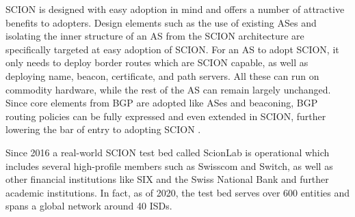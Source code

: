 \documentclass[../eva1_scion.tex]{subfiles}
\begin{document}
    SCION is designed with easy adoption in mind and offers a number of attractive benefits to adopters. Design elements such as the use of existing ASes and isolating the inner structure of an AS from the SCION architecture are specifically targeted at easy adoption of SCION. For an AS to adopt SCION, it only needs to deploy border routes which are SCION capable, as well as deploying name, beacon, certificate, and path servers. All these can run on commodity hardware, while the rest of the AS can remain largely unchanged. Since core elements from BGP are adopted like ASes and beaconing, BGP routing policies can be fully expressed and even extended in SCION, further lowering the bar of entry to adopting SCION \cite{scion_2017}.

    Since 2016 a real-world SCION test bed called ScionLab is operational \cite{testbed_2020} which includes several high-profile members such as Swisscom and Switch, as well as other financial institutions like SIX and the Swiss National Bank \cite{snb} and further academic institutions. In fact, as of 2020, the test bed serves over 600 entities and spans a global network around 40 ISDs.
\end{document}
